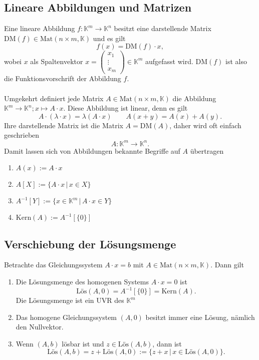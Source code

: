 \documentclass[a4paper,12pt]{article}
\numberwithin{equation}{section}
\begin{document}
\subsection{Lineare Abbildungen und Matrizen}
Eine lineare Abbildung $f:\mathbb{K}^{m}\rightarrow \mathbb{K}^{n}$ besitzt eine darstellende Matrix $\text{DM}\left(f\right) \in \text{Mat}\left(n\times m,\mathbb{K}\right)$ und es gilt
\[ 
        f\left(x\right)=\text{DM}\left(f\right)\cdot x
,\] 
wobei $x$ als Spaltenvektor $x=\left(\begin{matrix}
        x_1\\\vdots\\x_{m}
\end{matrix}\right) \in \mathbb{K}^{m}$ aufgefasst wird. $\text{DM}\left(f\right)$ ist also die Funktionsvorschrift der Abbildung $f$.\\\\
Umgekehrt definiert jede Matrix $A \in \text{Mat}\left(n\times m,\mathbb{K}\right)$ die Abbildung $\mathbb{K}^{m}\rightarrow \mathbb{K}^{n};x\mapsto A\cdot x$. Diese Abbildung ist linear, denn es gilt
\[ 
        A\cdot \left(\lambda \cdot x\right)=\lambda \left(A\cdot x\right)\qquad A\left(x+y\right)=A\left(x\right)+A\left(y\right)
.\] 
Ihre darstellende Matrix ist die Matrix $A=\text{DM}\left(A\right)$, daher wird oft einfach geschrieben
\[ 
        A:\mathbb{K}^{m}\rightarrow \mathbb{K}^{n}
.\] 
Damit lassen sich von Abbildungen bekannte Begriffe auf $A$ übertragen
\begin{enumerate}[label=--]
        \item $A\left(x\right):=A\cdot x$ 
        \item $A[X]:=\{A\cdot x\,|\, x \in X\}$ 
        \item $A^{-1}[Y]:=\{x \in \mathbb{K}^{m}\,|\, A\cdot x \in Y\}$ 
        \item $\text{Kern}\left(A\right):=A^{-1}[\{0\}]$ 
\end{enumerate}

\subsection{Verschiebung der Lösungsmenge}
Betrachte das Gleichungssystem $A\cdot x=b$ mit $A \in \text{Mat}\left(n\times m,\mathbb{K}\right)$. Dann gilt
\begin{enumerate}[label=(\alph*)]
        \item Die Lösungsmenge des homogenen Systems $A\cdot x=0$ ist
                \[ 
                        \text{Lös}\left(A,0\right)=A^{-1}[\{0\}]=\text{Kern}\left(A\right)
                .\] 
                Die Lösungsmenge ist ein UVR des $\mathbb{K}^{m}$ 
        \item Das homogene Gleichungssystem $\left(A,0\right)$ besitzt immer eine Lösung, nämlich den Nullvektor.
        \item Wenn $\left(A,b\right)$ lösbar ist und $z \in \text{Lös}\left(A,b\right)$, dann ist 
                \[ 
                        \text{Lös}\left(A,b\right)=z+\text{Lös}\left(A,0\right):=\{z+x\,|\, x \in \text{Lös}\left(A,0\right)\}
                .\] 
\end{enumerate}
\end{document}
